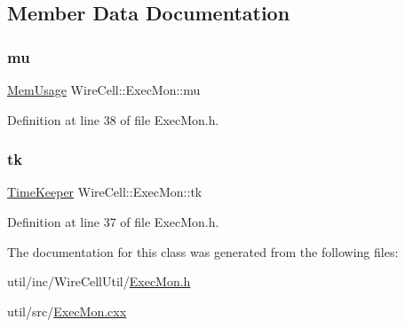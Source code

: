 \subsection{Member Data Documentation}
\mbox{\label{class_wire_cell_1_1_exec_mon_a7401839fabb43101f59468d9a1b43864}} 
\subsubsection{\texorpdfstring{mu}{mu}}
{\footnotesize\ttfamily \hyperlink{class_wire_cell_1_1_mem_usage}{Mem\+Usage} Wire\+Cell\+::\+Exec\+Mon\+::mu}



Definition at line 38 of file Exec\+Mon.\+h.

\mbox{\label{class_wire_cell_1_1_exec_mon_abdbaf65a4ec1def3a226c7b94851ed3d}} 
\subsubsection{\texorpdfstring{tk}{tk}}
{\footnotesize\ttfamily \hyperlink{class_wire_cell_1_1_time_keeper}{Time\+Keeper} Wire\+Cell\+::\+Exec\+Mon\+::tk}



Definition at line 37 of file Exec\+Mon.\+h.



The documentation for this class was generated from the following files\+:\begin{DoxyCompactItemize}
\item 
util/inc/\+Wire\+Cell\+Util/\hyperlink{_exec_mon_8h}{Exec\+Mon.\+h}\item 
util/src/\hyperlink{_exec_mon_8cxx}{Exec\+Mon.\+cxx}\end{DoxyCompactItemize}
